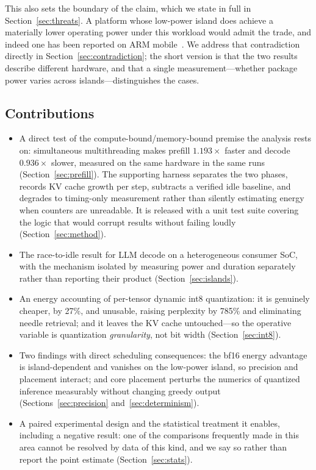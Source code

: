 \documentclass[journal]{IEEEtran}
\begin{document}
This also sets the boundary of the claim, which we state in full in
Section~\ref{sec:threats}. A platform whose low-power island
does achieve a materially lower operating power under this workload would
admit the trade, and indeed one has been reported on ARM
mobile~\cite{mnn2025aecs}. We address that contradiction directly in
Section~\ref{sec:contradiction}; the short version is that the two results
describe different hardware, and that a single measurement---whether package
power varies across islands---distinguishes the cases.

\subsection{Contributions}
\begin{itemize}
\item A direct test of the compute-bound/memory-bound premise the analysis
  rests on: simultaneous multithreading makes prefill $1.193\times$ faster and
  decode $0.936\times$ slower, measured on the same hardware in the same runs
  (Section~\ref{sec:prefill}). The supporting harness separates the two phases,
  records KV cache growth per step,
  subtracts a verified idle baseline, and degrades to timing-only measurement
  rather than silently estimating energy when counters are unreadable. It is
  released with a unit test suite covering the logic that would corrupt results
  without failing loudly (Section~\ref{sec:method}).
\item The race-to-idle result for LLM decode on a heterogeneous consumer SoC,
  with the mechanism isolated by measuring power and duration separately rather
  than reporting their product (Section~\ref{sec:islands}).
\item An energy accounting of per-tensor dynamic int8 quantization: it is
  genuinely cheaper, by 27\%, and unusable, raising perplexity by 785\% and
  eliminating needle retrieval; and it leaves the KV cache untouched---so the
  operative variable is quantization \emph{granularity}, not bit width
  (Section~\ref{sec:int8}).
\item Two findings with direct scheduling consequences: the bf16 energy
  advantage is island-dependent and vanishes on the low-power island, so
  precision and placement interact; and core placement perturbs the numerics of
  quantized inference measurably without changing greedy output
  (Sections~\ref{sec:precision} and~\ref{sec:determinism}).
\item A paired experimental design and the statistical treatment it enables,
  including a negative result: one of the comparisons frequently made in this
  area cannot be resolved by data of this kind, and we say so rather than
  report the point estimate (Section~\ref{sec:stats}).
\end{itemize}
\end{document}
